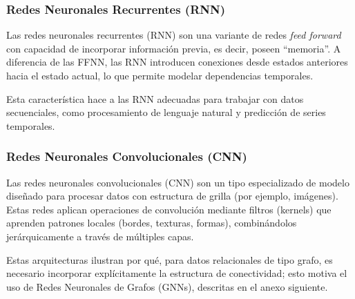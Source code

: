 \subsubsection{Redes Neuronales Recurrentes (RNN)}

Las redes neuronales recurrentes (RNN) son una variante de redes \textit{feed forward} con capacidad de incorporar información previa, es decir, poseen ``memoria''. A diferencia de las FFNN, las RNN introducen conexiones desde estados anteriores hacia el estado actual, lo que permite modelar dependencias temporales.

Esta característica hace a las RNN adecuadas para trabajar con datos secuenciales, como procesamiento de lenguaje natural y predicción de series temporales.

\subsubsection{Redes Neuronales Convolucionales (CNN)}

Las redes neuronales convolucionales (CNN) son un tipo especializado de modelo diseñado para procesar datos con estructura de grilla (por ejemplo, imágenes). Estas redes aplican operaciones de convolución mediante filtros (kernels) que aprenden patrones locales (bordes, texturas, formas), combinándolos jerárquicamente a través de múltiples capas.

Estas arquitecturas ilustran por qué, para datos relacionales de tipo grafo, es necesario incorporar explícitamente la estructura de conectividad; esto motiva el uso de Redes Neuronales de Grafos (GNNs), descritas en el anexo siguiente.

